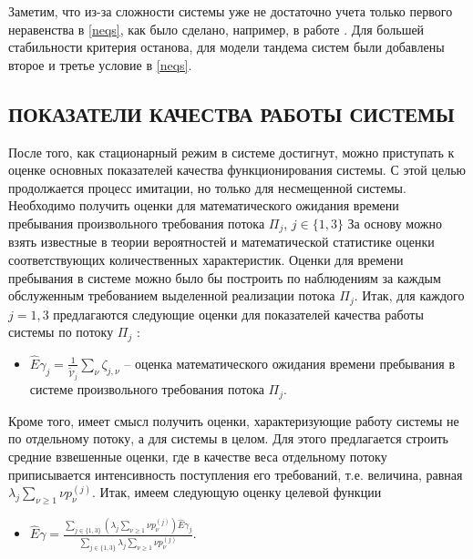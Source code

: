 \documentclass[11pt]{ubs}
\begin{document}
Заметим, что из-за сложности системы уже не достаточно учета только первого неравенства  в \eqref{neqs}, как было сделано, например, в работе \cite{Fedotkin:Rachinskaya:2016}. Для большей стабильности критерия останова, для модели тандема систем были добавлены второе и третье условие в \eqref{neqs}. 

\subsection{ПОКАЗАТЕЛИ КАЧЕСТВА РАБОТЫ СИСТЕМЫ}
После того, как стационарный режим в системе достигнут, можно приступать к оценке основных показателей качества функционирования системы. С этой целью продолжается процесс имитации, но только для несмещенной системы. Необходимо получить оценки для математического ожидания времени пребывания произвольного требования потока $\Pi_j$, $j\in \{1, 3\}$
За основу можно взять известные в теории вероятностей и математической статистике оценки соответствующих количественных характеристик. Оценки для времени пребывания в системе можно было бы построить по наблюдениям за каждым обслуженным требованием выделенной реализации потока $\Pi_j$.
Итак, для каждого $j=1,3$  предлагаются следующие оценки для показателей качества работы системы по потоку $\Pi_j$ :
\begin{itemize}
    \item $\hat{E}\gamma_{j}=\frac{1}{\tilde{\mathcal{V}}_j}\sum_{\nu}\zeta_{j,\nu}$  -- оценка математического ожидания времени пребывания в системе произвольного требования потока $\Pi_j$.
\end{itemize}
Кроме того, имеет смысл получить оценки, характеризующие работу системы не по отдельному потоку, а для системы в целом. Для этого предлагается строить средние взвешенные оценки, где в качестве веса отдельному потоку  приписывается интенсивность поступления его требований, т.е. величина, равная $\lambda_j \sum_{\nu\geqslant1}\nu p_{\nu}^{(j)}$. Итак, имеем следующую оценку целевой функции
\begin{itemize}
    \item $\hat{E}\gamma=\frac{\sum_{j\in\{1,3\}} (\lambda_j \sum_{\nu\geqslant1}\nu p_{\nu}^{(j)})\hat{E}\gamma_{j} }{\sum_{j\in\{1,3\}} \lambda_j \sum_{\nu\geqslant1}\nu p_{\nu}^{(j)}}$.
\end{itemize}
\end{document}
